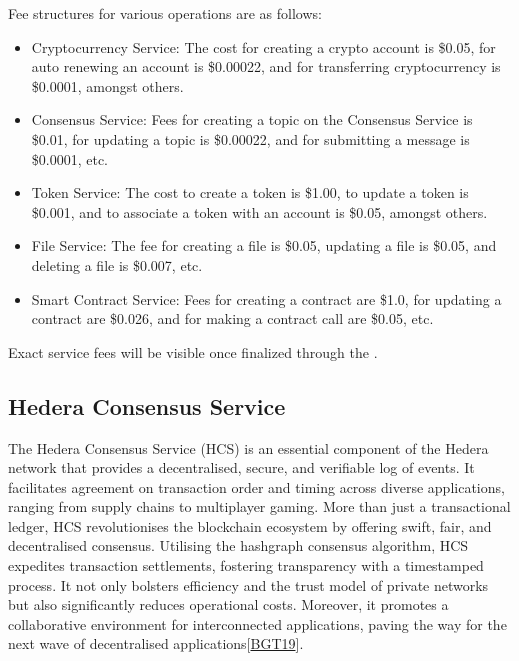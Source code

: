 \documentclass[letterpaper,10pt,english]{jupyterBook}
\begin{document}
\sphinxAtStartPar
Fee structures for various operations are as follows:
\begin{itemize}
\item {} 
\sphinxAtStartPar
Cryptocurrency Service: The cost for creating a crypto account is \$0.05, for auto renewing an account is \$0.00022, and for transferring cryptocurrency is \$0.0001, amongst others.

\item {} 
\sphinxAtStartPar
Consensus Service: Fees for creating a topic on the Consensus Service is \$0.01, for updating a topic is \$0.00022, and for submitting a message is \$0.0001, etc.

\item {} 
\sphinxAtStartPar
Token Service: The cost to create a token is \$1.00, to update a token is \$0.001, and to associate a token with an account is \$0.05, amongst others.

\item {} 
\sphinxAtStartPar
File Service: The fee for creating a file is \$0.05, updating a file is \$0.05, and deleting a file is \$0.007, etc.

\item {} 
\sphinxAtStartPar
Smart Contract Service: Fees for creating a contract are \$1.0, for updating a contract are \$0.026, and for making a contract call are \$0.05, etc.

\end{itemize}

\sphinxAtStartPar
Exact service fees will be visible once finalized through the .


\subsection{Hedera Consensus Service}
\label{\detokenize{HED/hed:hedera-consensus-service}}
\sphinxAtStartPar
The Hedera Consensus Service (HCS) is an essential component of the Hedera network that provides a decentralised, secure, and verifiable log of events. It facilitates agreement on transaction order and timing across diverse applications, ranging from supply chains to multiplayer gaming. More than just a transactional ledger, HCS revolutionises the blockchain ecosystem by offering swift, fair, and decentralised consensus. Utilising the hashgraph consensus algorithm, HCS expedites transaction settlements, fostering transparency with a timestamped process. It not only bolsters efficiency and the trust model of private networks but also significantly reduces operational costs. Moreover, it promotes a collaborative environment for interconnected applications, paving the way for the next wave of decentralised applications{[}\hyperlink{cite.HED/hed:id123}{BGT19}{]}.
\end{document}
